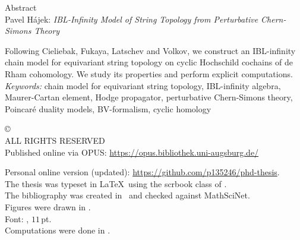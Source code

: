 \documentclass[\MainFolder/Text.tex]{subfiles}
\begin{document}
\begin{center}
  {\LARGE Abstract}\\[0.5cm]
  Pavel H\'ajek: {\itshape IBL-Infinity Model of String Topology from Perturbative Chern-Simons Theory}
\end{center}

Following Cieliebak, Fukaya, Latschev and Volkov, we construct an IBL-infinity chain model for equivariant string topology on cyclic Hochschild cochains of de Rham cohomology. We study its properties and perform explicit computations.\vspace{.8cm}\\
\noindent \emph{Keywords:} chain model for equivariant string topology, IBL-infinity algebra, Maurer-Cartan element, Hodge propagator, perturbative Chern-Simons theory, Poincar\'e duality models, BV-formalism, cyclic homology
\clearpage 
{\null\vfill
\begin{flushleft}
\makeatletter
\copyright\ \the\year\ \@author\\
ALL RIGHTS RESERVED
\makeatother\\[\baselineskip]

Published online via OPUS:  \url{https://opus.bibliothek.uni-augsburg.de/}

Personal online version (updated): \url{https://github.com/p135246/phd-thesis}.\\[\baselineskip]

The thesis was typeset in \LaTeX\ using the \textsf{scrbook} class of \Komaname. \\
The bibliography was created in \Biblatexname\ and checked against \textsf{MathSciNet}. \\
Figures were drawn in \Tikzname.\\
Font: \Libertinename, $11$\,pt.\\
Computations were done in \Mathematicaname.\\[\baselineskip]
\end{flushleft}
}
\end{document}
